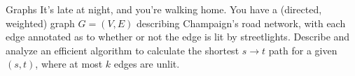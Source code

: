 \documentclass{beamer}
\begin{document}
\begin{frame}[t]{Graphs}
    It's late at night, and you're walking home. You have a (directed, weighted) graph $G = (V, E)$ describing Champaign's road network, with each edge annotated as to whether or not the edge is lit by streetlights. Describe and analyze an efficient algorithm to calculate the shortest $s \rightarrow t$ path for a given $(s, t)$, where at most $k$ edges are unlit.
\end{frame}


\end{document}
